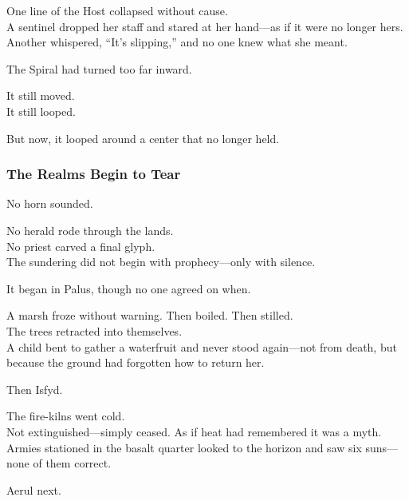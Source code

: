 \documentclass[12pt]{article}
\begin{document}
\vspace{0.5em}
One line of the Host collapsed without cause.\\
A sentinel dropped her staff and stared at her hand---as if it were no longer hers.\\
Another whispered, ``It’s slipping,'' and no one knew what she meant.

\vspace{0.5em}
The Spiral had turned too far inward.

\vspace{0.5em}
It still moved.\\
It still looped.

\vspace{0.5em}
But now, it looped around a center that no longer held.

\dotfill

\subsubsection*{The Realms Begin to Tear}

No horn sounded.

\vspace{0.5em}
No herald rode through the lands.\\
No priest carved a final glyph.\\
The sundering did not begin with prophecy---only with silence.

\vspace{0.5em}
It began in Palus, though no one agreed on when.

\vspace{0.5em}
A marsh froze without warning. Then boiled. Then stilled.\\
The trees retracted into themselves.\\
A child bent to gather a waterfruit and never stood again---not from death, but because the ground had forgotten how to return her.

\vspace{0.5em}
Then Isfyd.

\vspace{0.5em}
The fire-kilns went cold.\\
Not extinguished---simply ceased. As if heat had remembered it was a myth.\\
Armies stationed in the basalt quarter looked to the horizon and saw six suns---none of them correct.

\vspace{0.5em}
Aerul next.
\end{document}
